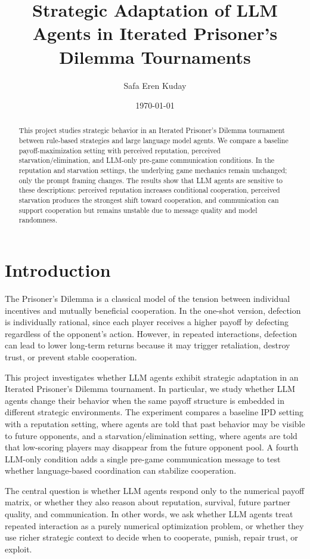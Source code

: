\documentclass[11pt]{article}
\title{Strategic Adaptation of LLM Agents in Iterated Prisoner's Dilemma Tournaments}
\author{Safa Eren Kuday}
\date{\today}
\begin{document}
\maketitle

\begin{abstract}
This project studies strategic behavior in an Iterated Prisoner’s Dilemma tournament between rule-based strategies and large language model agents. We compare a baseline payoff-maximization setting with perceived reputation, perceived starvation/elimination, and LLM-only pre-game communication conditions. In the reputation and starvation settings, the underlying game mechanics remain unchanged; only the prompt framing changes. The results show that LLM agents are sensitive to these descriptions: perceived reputation increases conditional cooperation, perceived starvation produces the strongest shift toward cooperation, and communication can support cooperation but remains unstable due to message quality and model randomness.
\end{abstract}

\section{Introduction}

The Prisoner's Dilemma is a classical model of the tension between individual incentives and mutually beneficial cooperation. In the one-shot version, defection is individually rational, since each player receives a higher payoff by defecting regardless of the opponent's action. However, in repeated interactions, defection can lead to lower long-term returns because it may trigger retaliation, destroy trust, or prevent stable cooperation.

This project investigates whether LLM agents exhibit strategic adaptation in an Iterated Prisoner's Dilemma tournament. In particular, we study whether LLM agents change their behavior when the same payoff structure is embedded in different strategic environments. The experiment compares a baseline IPD setting with a reputation setting, where agents are told that past behavior may be visible to future opponents, and a starvation/elimination setting, where agents are told that low-scoring players may disappear from the future opponent pool. A fourth LLM-only condition adds a single pre-game communication message to test whether language-based coordination can stabilize cooperation.

The central question is whether LLM agents respond only to the numerical payoff matrix, or whether they also reason about reputation, survival, future partner quality, and communication. In other words, we ask whether LLM agents treat repeated interaction as a purely numerical optimization problem, or whether they use richer strategic context to decide when to cooperate, punish, repair trust, or exploit.
\end{document}
